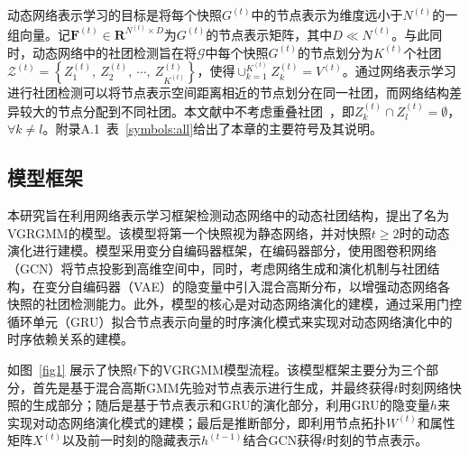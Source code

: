 动态网络表示学习的目标是将每个快照$G^{(t)}$中的节点表示为维度远小于$N^{(t)}$的一组向量。记$\mathbf{F}^{(t)} \in \boldsymbol{R}^{N^{(t)}\times D}$为$G^{(t)}$的节点表示矩阵，其中$D \ll N^{(t)}$。与此同时，动态网络中的社团检测旨在将$\mathcal{G}$中每个快照$G^{(t)}$的节点划分为$K^{(t)}$个社团$\mathcal{Z}^{(t)} = \left\{Z_{1}^{(t)},\ Z_{2}^{(t)},\ \cdots,\ Z_{K^{(t)}}^{(t)} \right\}$，使得$\cup_{k=1}^{K^{(t)}} Z_{k}^{(t)} = V^{(t)}$。通过网络表示学习进行社团检测可以将节点表示空间距离相近的节点划分在同一社团，而网络结构差异较大的节点分配到不同社团。本文献中不考虑重叠社团~\cite{10526486}，即$Z_{k}^{(t)} \cap Z_{l}^{(t)} = \emptyset$，$\forall k \neq l$。附录A.1~表~\ref{symbols:all}给出了本章的主要符号及其说明。

\subsection{模型框架}

本研究旨在利用网络表示学习框架检测动态网络中的动态社团结构，提出了名为VGRGMM的模型。该模型将第一个快照视为静态网络，并对快照$t \ge 2$时的动态演化进行建模。模型采用变分自编码器框架，在编码器部分，使用图卷积网络（GCN）\cite{Kipf.2017.Welling}将节点投影到高维空间中，同时，考虑网络生成和演化机制与社团结构，在变分自编码器（VAE）\cite{jiang2024incomplete}的隐变量中引入混合高斯分布，以增强动态网络各快照的社团检测能力。此外，模型的核心是对动态网络演化的建模，通过采用门控循环单元（GRU）拟合节点表示向量的时序演化模式来实现对动态网络演化中的时序依赖关系的建模。
 

如图~\ref{fig1} 展示了快照$t$下的VGRGMM模型流程。该模型框架主要分为三个部分，首先是基于混合高斯GMM先验对节点表示进行生成，并最终获得$t$时刻网络快照的生成部分；随后是基于节点表示和GRU的演化部分，利用GRU的隐变量$h$来实现对动态网络演化模式的建模；最后是推断部分，即利用节点拓扑$W^{(t)}$和属性矩阵$X^{(t)}$以及前一时刻的隐藏表示$h^{(t-1)}$结合GCN获得$t$时刻的节点表示。




